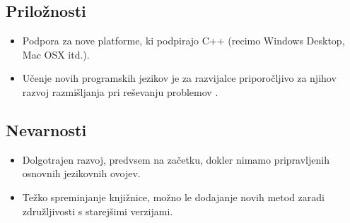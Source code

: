 \subsection{Priložnosti}

\begin{itemize}
  \item Podpora za nove platforme, ki podpirajo C++ (recimo Windows Desktop, Mac OSX itd.).
  \item Učenje novih programskih jezikov je za razvijalce priporočljivo za njihov razvoj razmišljanja pri reševanju problemov \cite{pragprog}.
\end{itemize}

\subsection{Nevarnosti}

\begin{itemize}
  \item Dolgotrajen razvoj, predvsem na začetku, dokler nimamo pripravljenih osnovnih jezikovnih ovojev.
  \item Težko spreminjanje knjižnice, možno le dodajanje novih metod zaradi združljivosti s starejšimi verzijami.
\end{itemize}